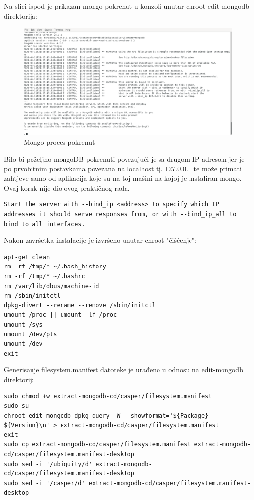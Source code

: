 \documentclass[12pt,vi]{mitthesis}
\begin{document}
Na slici ispod je prikazan mongo pokrenut u konzoli unutar chroot edit-mongodb direktorija:\\
\begin{figure}[!htb]
\centering
\includegraphics[width=\linewidth]{images/mongoRunning.png}
\caption{Mongo proces pokrenut}
\end{figure}
Bilo bi poželjno mongoDB pokrenuti povezujući je sa drugom IP adresom jer je po prvobitnim postavkama povezana na localhost tj. 127.0.0.1 te može primati zahtjeve samo od aplikacija koje su na toj mašini na kojoj je instaliran mongo. Ovaj korak nije dio ovog praktičnog rada.
\begin{lstlisting}[style=BashInputStyle]
Start the server with --bind_ip <address> to specify which IP addresses it should serve responses from, or with --bind_ip_all to bind to all interfaces.
\end{lstlisting}
\noindent
Nakon završetka instalacije je izvršeno unutar chroot "čišćenje":
\begin{lstlisting}[style=BashInputStyle]
apt-get clean
rm -rf /tmp/* ~/.bash_history
rm -rf /tmp/* ~/.bashrc
rm /var/lib/dbus/machine-id
rm /sbin/initctl
dpkg-divert --rename --remove /sbin/initctl
umount /proc || umount -lf /proc
umount /sys
umount /dev/pts
umount /dev
exit
\end{lstlisting}

\noindent
Generisanje filesystem.manifest datoteke je urađeno u odnosu na edit-mongodb direktorij:
\begin{lstlisting}[style=BashInputStyle]
sudo chmod +w extract-mongodb-cd/casper/filesystem.manifest
sudo su
chroot edit-mongodb dpkg-query -W --showformat='${Package} ${Version}\n' > extract-mongodb-cd/casper/filesystem.manifest
exit
sudo cp extract-mongodb-cd/casper/filesystem.manifest extract-mongodb-cd/casper/filesystem.manifest-desktop
sudo sed -i '/ubiquity/d' extract-mongodb-cd/casper/filesystem.manifest-desktop
sudo sed -i '/casper/d' extract-mongodb-cd/casper/filesystem.manifest-desktop
\end{lstlisting}
\end{document}

